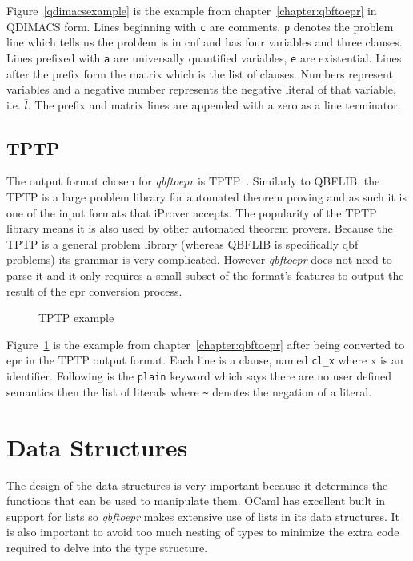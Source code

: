 Figure~\ref{qdimacsexample} is the example from chapter~\ref{chapter:qbftoepr} in QDIMACS form. Lines beginning with \texttt{c} are comments, \texttt{p} denotes the problem line which tells us the problem is in \gls{cnf} and has four variables and three clauses. Lines prefixed with \texttt{a} are universally quantified variables, \texttt{e} are existential. Lines after the prefix form the matrix which is the list of clauses. Numbers represent variables and a negative number represents the negative literal of that variable, i.e. $\bar{l}$. The prefix and matrix lines are appended with a zero as a line terminator.

\subsection{TPTP}
The output format chosen for \textit{qbftoepr} is TPTP~\cite{SS98}. Similarly to QBFLIB, the TPTP is a large problem library for automated theorem proving and as such it is one of the input formats that iProver accepts. The popularity of the TPTP library means it is also used by other automated theorem provers. Because the TPTP is a general problem library (whereas QBFLIB is specifically \gls{qbf} problems) its grammar is very complicated. However \textit{qbftoepr} does not need to parse it and it only requires a small subset of the format's features to output the result of the \gls{epr} conversion process.

\begin{figure}[H]
\caption{TPTP example}
\label{tptpexample}
\begin{CenteredBox}

\end{CenteredBox}
\end{figure}

Figure~\ref{tptpexample} is the example from chapter~\ref{chapter:qbftoepr} after being converted to \gls{epr} in the TPTP output format. Each line is a clause, named \texttt{cl\_x} where x is an identifier. Following is the \texttt{plain} keyword which says there are no user defined semantics then the list of literals where \texttt{\textasciitilde} denotes the negation of a literal.

\section{Data Structures} \label{datastructures}
The design of the data structures is very important because it determines the functions that can be used to manipulate them. OCaml has excellent built in support for lists so \textit{qbftoepr} makes extensive use of lists in its data structures. It is also important to avoid too much nesting of types to minimize the extra code required to delve into the type structure.


